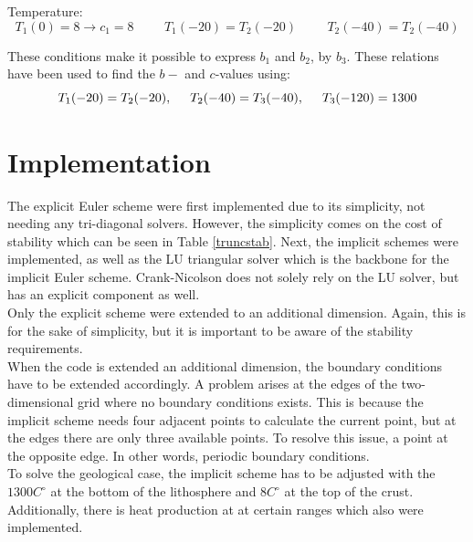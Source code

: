 \documentclass[10pt,a4paper]{article}
\begin{document}
\noindent Temperature:
\begin{equation}
T_1(0)=8 \rightarrow c_1=8 \hspace{1cm}
T_1(-20)=T_2(-20) \hspace{1cm}
T_2(-40)=T_2(-40)
\end{equation}




\noindent These conditions make it possible to express $b_1$ and $b_2$, by $b_3$.
\noindent These relations have been used to find the $b-$ and $c$-values using:
\begin{equation}
T_1(-20)=T_2(-20),\hspace{0.5cm} T_2(-40)=T_3(-40), \hspace{0.5cm}T_3(-120)=1300
\label{crelation}
\end{equation}






\section*{Implementation}

\noindent The explicit Euler scheme were first implemented due to its simplicity, not needing any tri-diagonal solvers. However, the simplicity comes on the cost of stability which can be seen in Table \ref{truncstab}. Next, the implicit schemes were implemented, as well as the LU triangular solver which is the backbone for the implicit Euler scheme. Crank-Nicolson does not solely rely on the LU solver, but has an explicit component as well.\\

\noindent Only the explicit scheme were extended to an additional dimension. Again, this is for the sake of simplicity, but it is important to be aware of the stability requirements. \\

\noindent When the code is extended an additional dimension, the boundary conditions have to be extended accordingly. A problem arises at the edges of the two-dimensional grid where no boundary conditions exists. This is because the implicit scheme needs four adjacent points to calculate the current point, but at the edges there are only three available points. To resolve this issue, a point at the opposite edge. In other words, periodic boundary conditions. \\


\noindent To solve the geological case, the implicit scheme has to be adjusted with the $1300 C^{\circ}$ at the bottom of the lithosphere and $8 C^{\circ}$ at the top of the crust. Additionally, there is heat production at at certain ranges which also were implemented.
\end{document}
